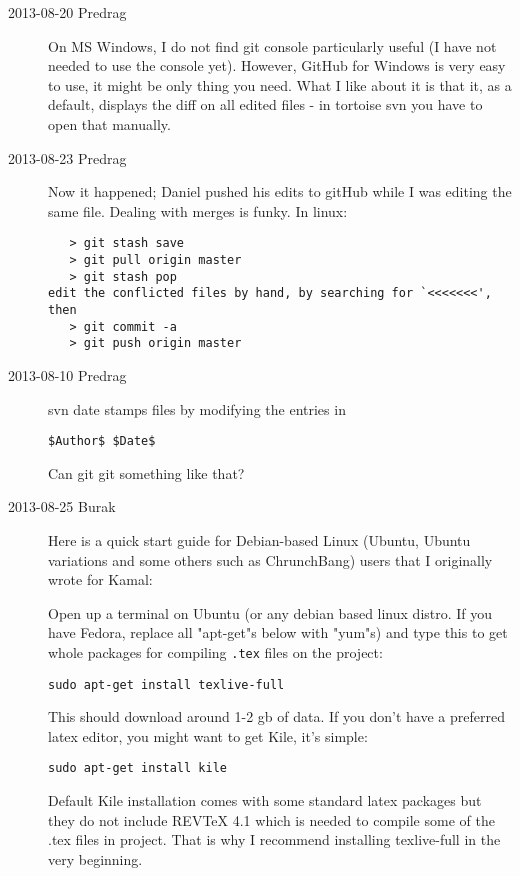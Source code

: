\begin{description}
\item[2013-08-20 Predrag] On MS Windows, I do not find
 {git console} particularly useful (I have
not needed to use the console yet). However,
 {GitHub for Windows} is very easy
to use, it might be only thing you need. What I like about it is that
it, as a default, displays the diff on all edited files - in tortoise
svn you have to open that manually.

\item[2013-08-23 Predrag] Now it happened; Daniel pushed his edits to gitHub
while I was editing the same file. Dealing with merges is funky. In linux:
\begin{verbatim}
   > git stash save
   > git pull origin master
   > git stash pop
edit the conflicted files by hand, by searching for `<<<<<<<', then
   > git commit -a
   > git push origin master
\end{verbatim}


\item[2013-08-10 Predrag] svn date stamps files by modifying the entries in
\begin{verbatim}
$Author$ $Date$
\end{verbatim}
Can git git something like that?

\item[2013-08-25 Burak] Here is a quick start guide for Debian-based Linux (Ubuntu, Ubuntu variations and some others such as ChrunchBang) users that I originally wrote for Kamal:

Open up a terminal on Ubuntu (or any debian based linux distro. If you have Fedora, replace all "apt-get"s below with "yum"s) and type this to get whole packages for compiling \texttt{.tex} files on the project:

\begin{verbatim}
sudo apt-get install texlive-full
\end{verbatim}

This should download around 1-2 gb of data. If you don't have a preferred latex editor, you might want to get Kile, it's simple:

\begin{verbatim}
sudo apt-get install kile
\end{verbatim}

Default Kile installation comes with some standard latex packages but they do not include REVTeX 4.1 which is needed to compile some of the .tex files in project. That is why I recommend installing texlive-full in the very beginning.


\end{description}
